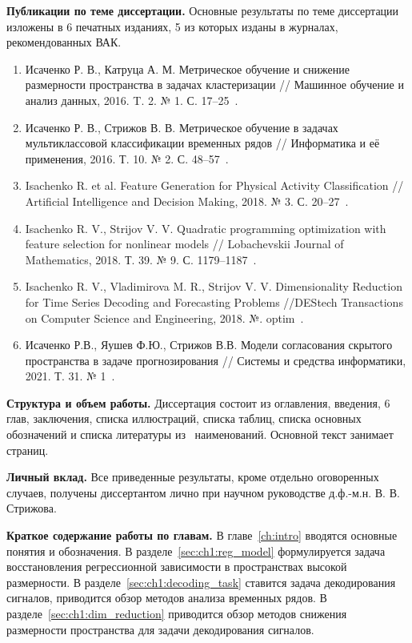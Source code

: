 \vspace{0.5cm}
\textbf{Публикации по теме диссертации.}
Основные результаты по теме диссертации изложены в 6 печатных изданиях, 5 из которых изданы в журналах, рекомендованных ВАК.

\begin{enumerate}
	\item Исаченко Р. В., Катруца А. М. Метрическое обучение и снижение размерности пространства в задачах кластеризации // Машинное обучение и анализ данных, 2016. T. 2. № 1. С. 17--25~\cite{isachenko2016metricjmlda}.
	\item Исаченко Р. В., Стрижов В. В. Метрическое обучение в задачах мультиклассовой классификации временных рядов // Информатика и её применения, 2016. Т. 10. № 2. С. 48--57~\cite{isachenko2016metricia}.
	\item Isachenko R. et al. Feature Generation for Physical Activity Classification // Artificial Intelligence and Decision Making, 2018. № 3. С. 20--27~\cite{isachenko2018feature}.
	\item Isachenko R. V., Strijov V. V. Quadratic programming optimization with feature selection for nonlinear models // Lobachevskii Journal of Mathematics, 2018. Т. 39. № 9. С. 1179--1187~\cite{isachenko2018quadratic}.
	\item Isachenko R. V., Vladimirova M. R., Strijov V. V. Dimensionality Reduction for Time Series Decoding and Forecasting Problems //DEStech Transactions on Computer Science and Engineering, 2018. №. optim~\cite{isachenko2018plsdestech}.
	\item Исаченко Р.В., Яушев Ф.Ю., Стрижов В.В. Модели согласования скрытого пространства в задаче прогнозирования // Системы и средства информатики, 2021. Т. 31. № 1~\cite{isachenko2021concordance}.
\end{enumerate}

\vspace{0.5cm}
\textbf{Структура и объем работы.}
Диссертация состоит из оглавления, введения, 6 глав, заключения, списка иллюстраций, списка таблиц, списка основных обозначений и списка литературы из~ наименований. 
Основной текст занимает~\pageref{LastPage} страниц.

\vspace{0.5cm}
\textbf{Личный вклад.}
Все приведенные результаты, кроме отдельно оговоренных случаев, получены диссертантом лично при научном руководстве д.ф.-м.н. В. В. Стрижова.

\vspace{0.5cm}
\textbf{Краткое содержание работы по главам.}
В главе~\ref{ch:intro} вводятся основные понятия и обозначения. 
В разделе~\ref{sec:ch1:reg_model} формулируется задача восстановления регрессионной зависимости в пространствах высокой размерности.
В разделе~\ref{sec:ch1:decoding_task} ставится задача декодирования сигналов, приводится обзор методов анализа временных рядов.
В разделе~\ref{sec:ch1:dim_reduction} приводится обзор методов снижения размерности пространства для задачи декодирования сигналов.

